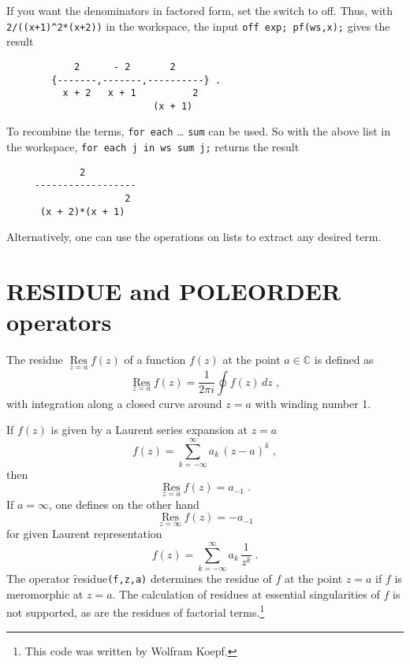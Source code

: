 If you want the denominators in factored form, set the switch  to off.
Thus, with \texttt{2/((x+1)\textasciicircum2*(x+2))} in the workspace,
the input \texttt{off exp; pf(ws,x);} gives the result
\begin{verbatim}
            2      - 2       2
        {-------,-------,----------} .
          x + 2   x + 1          2
                          (x + 1)
\end{verbatim}

To recombine the terms, \texttt{for each} \ldots{} \texttt{sum} can be used.
So with the above list in the workspace,
\texttt{for each j in ws sum j;} returns the result
\begin{verbatim}
             2
     ------------------
                     2
      (x + 2)*(x + 1)
\end{verbatim}

Alternatively, one can use the operations on lists to extract any desired
term.


\section{RESIDUE and POLEORDER operators}
\hypertarget{operator:RESIDUE}{}
\hypertarget{operator:POLEORDER}{}

The residue
$\mathop{\mathrm{Res}}\limits_{z=a} f(z)$ of a function $f(z)$ at the point $a\in\mathbb{C}$ is defined
as
\[
\mathop{\mathrm{Res}}\limits_{z=a} f(z)=
\frac{1}{2 \pi i}\oint f(z)\,dz
\;,
\]
with integration along a closed curve around $z=a$ with winding number 1.

If $f(z)$ is given by a Laurent series expansion at $z=a$
\[
f(z)=\sum_{k=-\infty}^\infty a_k\,(z-a)^k
\;,
\]
then
\begin{equation}
\mathop{\mathrm{Res}}\limits_{z=a} f(z)=a_{-1}
\;.
\label{eq:Laurent}
\end{equation}
If $a=\infty$, one defines on the other hand
\begin{equation}
\mathop{\mathrm{Res}}\limits_{z=\infty} f(z)=-a_{-1}
\label{eq:Laurent2}
\end{equation}
for given Laurent representation
\[
f(z)=\sum_{k=-\infty}^\infty a_k\,\frac{1}{z^k}
\;.
\]
The operator \f{residue}\texttt{(f,z,a)} determines the residue of $f$ at the point $z=a$
if $f$ is meromorphic at $z=a$. The calculation of residues at essential
singularities of $f$ is not supported, as are the residues of factorial terms.\footnote{This code was written by Wolfram Koepf.}

